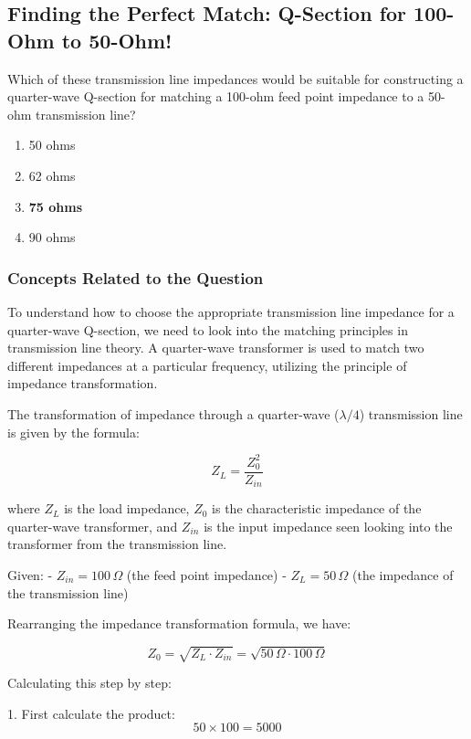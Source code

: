 \subsection{Finding the Perfect Match: Q-Section for 100-Ohm to 50-Ohm!}

\begin{tcolorbox}[colback=gray!10, colframe=black, title=E9E06] 
Which of these transmission line impedances would be suitable for constructing a quarter-wave Q-section for matching a 100-ohm feed point impedance to a 50-ohm transmission line?

\begin{enumerate}[label=\Alph*.]
    \item 50 ohms
    \item 62 ohms
    \item \textbf{75 ohms}
    \item 90 ohms
\end{enumerate} \end{tcolorbox}

\subsubsection{Concepts Related to the Question}
To understand how to choose the appropriate transmission line impedance for a quarter-wave Q-section, we need to look into the matching principles in transmission line theory. A quarter-wave transformer is used to match two different impedances at a particular frequency, utilizing the principle of impedance transformation.

The transformation of impedance through a quarter-wave (\(\lambda/4\)) transmission line is given by the formula:

\[
Z_L = \frac{Z_0^2}{Z_{in}}
\]

where \(Z_L\) is the load impedance, \(Z_0\) is the characteristic impedance of the quarter-wave transformer, and \(Z_{in}\) is the input impedance seen looking into the transformer from the transmission line.

Given:
- \(Z_{in} = 100 \, \Omega\) (the feed point impedance)
- \(Z_L = 50 \, \Omega\) (the impedance of the transmission line)

Rearranging the impedance transformation formula, we have:

\[
Z_0 = \sqrt{Z_L \cdot Z_{in}} = \sqrt{50 \, \Omega \cdot 100 \, \Omega}
\]

Calculating this step by step:

1. First calculate the product:
   \[
   50 \times 100 = 5000
   \]
   
